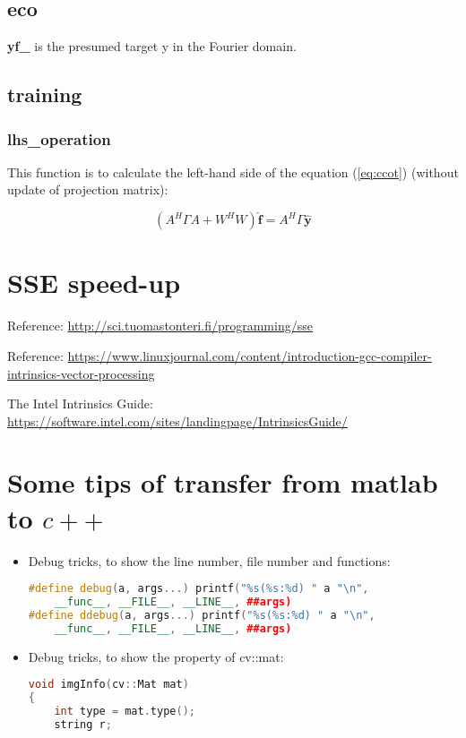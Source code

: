 \documentclass[12pt]{article}
\numberwithin{equation}{section}
\begin{document}
{\subsection{eco}
\textbf{yf\_} is the presumed target y in the Fourier domain. 
\subsection{training}
\subsubsection{lhs\_operation}
This function is to calculate the left-hand side of the equation (\ref{eq:ccot}) (without update of projection matrix): \par
\begin{equation} 
	(A^H \Gamma A + W^H W) \hat{\bm{f}} = A^H \Gamma \hat{\bm{y}}
\end{equation} \par

\section{SSE speed-up}
Reference: \url{http://sci.tuomastonteri.fi/programming/sse} \par
Reference: \url{https://www.linuxjournal.com/content/introduction-gcc-compiler-intrinsics-vector-processing} \par
The Intel Intrinsics Guide: \url{https://software.intel.com/sites/landingpage/IntrinsicsGuide/} \par
\section{Some tips of transfer from matlab to $c++$}
\begin{itemize}
	\item Debug tricks, to show the line number, file number and functions:
		\begin{lstlisting}[language=C++]
#define debug(a, args...) printf("%s(%s:%d) " a "\n", 
	__func__, __FILE__, __LINE__, ##args)
#define ddebug(a, args...) printf("%s(%s:%d) " a "\n", 
	__func__, __FILE__, __LINE__, ##args)
		\end{lstlisting}
	\item Debug tricks, to show the property of cv::mat:
		\begin{lstlisting}[language=C++]
void imgInfo(cv::Mat mat)
{
	int type = mat.type();
	string r;


\end{lstlisting}
\end{itemize}}
\end{document}
